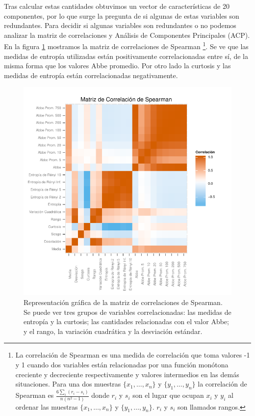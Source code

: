 \documentclass[letterpaper,12pt]{book}
\begin{document}
Tras calcular estas cantidades obtuvimos un vector de características de 20 componentes, por lo que surge la pregunta de si algunas de estas variables son redundantes. Para decidir si algunas variables son redundantes o no podemos analizar la matriz de correlaciones y Análisis de Componentes Principales (ACP). En la figura \ref{fig:correlacionSpearman} mostramos la matriz de correlaciones de Spearman \footnote{La correlación de Spearman es una medida de correlación que toma valores -1 y 1 cuando dos variables están relacionadas por una función monótona creciente y decreciente respectivamente y valores intermedios en las demás situaciones. Para una dos muestras $\{x_1,\dots,x_n\}$ y $\{y_1,\dots,y_n\}$  la correlación de Spearman es $\frac{6\sum_i (r_i-s_i)}{n(n^2-1)}$ donde $r_i$ y $s_i$ son el lugar que ocupan $x_i$ y $y_i$ al ordenar las muestras  $\{x_1,\dots,x_n\}$ y $\{y_1,\dots,y_n\}$. $r_i$ y $s_i$ son llamados rangos.}. Se ve que las medidas de entropía utilizadas están positivamente correlacionadas entre sí, de la misma forma que los valores Abbe promedio. Por otro lado la curtosis y las medidas de entropía están correlacionadas negativamente. 

\begin{figure}
  \centering
  \includegraphics[width = \textwidth]{./img/CClasificacion/correlacionSpearman.pdf}
  \caption{Representación gráfica de la matriz de correlaciones de Spearman. Se puede ver tres grupos de variables correlacionadas: las medidas de entropía y la curtosis; las cantidades relacionadas con el valor Abbe; y el rango, la variación cuadrática y la desviación estándar. }
  \label{fig:correlacionSpearman}
  \centering
\end{figure}
\end{document}
